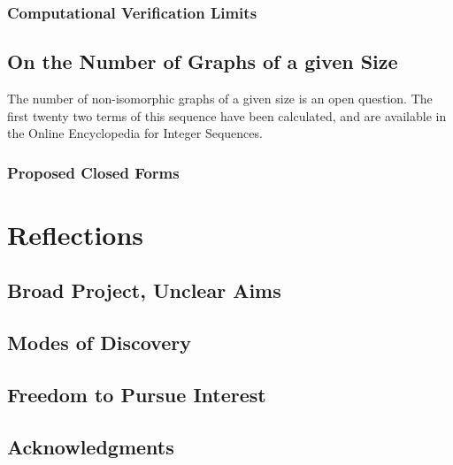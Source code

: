 \documentclass[11pt,a4paper]{report}
\begin{document}
\subsection{Computational Verification Limits}

\section{On the Number of Graphs of a given Size}
The number of non-isomorphic graphs of a given size is an open question.
The first twenty two terms of this sequence have been calculated, and are available in the Online Encyclopedia for Integer Sequences\cite{OEIS}.
\subsection{Proposed Closed Forms}



\chapter{Reflections}
\section{Broad Project, Unclear Aims}
\section{Modes of Discovery}
\section{Freedom to Pursue Interest}
\section{Acknowledgments}






\end{document}
